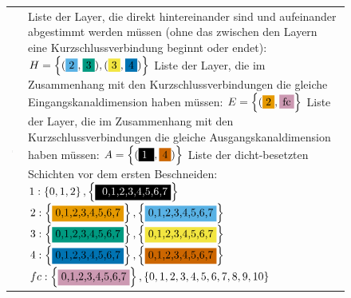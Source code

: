\begin{figure}
\begin{minipage}[c]{1\linewidth}
\begin{tabularx}{1\textwidth}{m{}m{}} \includegraphics[width=0.21\textwidth]{KapitelPartA/images/net.png} &Liste der Layer, die direkt hintereinander sind und aufeinander abgestimmt werden müssen (ohne das zwischen den Layern eine Kurzschlussverbindung beginnt oder endet): $H=\left\{(\colorbox{sky}{2},\colorbox{bluegreen}{3}),(\colorbox{yellow}{3},\colorbox{blue2}{4}) \right\}$\newline
Liste der Layer, die im Zusammenhang mit den Kurzschlussverbindungen die gleiche Eingangskanaldimension haben müssen: \newline$E=\left\{(\colorbox{orange}{2},\colorbox{purple}{fc} \right\}$ \newline
Liste der Layer, die im Zusammenhang mit den Kurzschlussverbindungen die gleiche Ausgangskanaldimension haben müssen: $A=\left\{ ( \colorbox{black}{\textcolor{white}{1} },\colorbox{vermi}{4} ) \right\} $ \newline
Liste der dicht-besetzten Schichten vor dem ersten Beschneiden:\newline
$1:\left\{0,1,2\right\},\left\{\colorbox{black}{ \textcolor{white}{0,1,2,3,4,5,6,7}} \right\}$ \newline
$2:\left\{\colorbox{orange}{0,1,2,3,4,5,6,7}\right\},\left\{\colorbox{sky}{0,1,2,3,4,5,6,7}\right\}$\newline
$3:\left\{\colorbox{bluegreen}{0,1,2,3,4,5,6,7}\right\},\left\{\colorbox{yellow}{0,1,2,3,4,5,6,7}\right\}$\newline
$4:\left\{\colorbox{blue2}{0,1,2,3,4,5,6,7}\right\},\left\{\colorbox{vermi}{0,1,2,3,4,5,6,7}\right\}$\newline
$fc:\left\{\colorbox{purple}{0,1,2,3,4,5,6,7}\right\},\left\{0,1,2,3,4,5,6,7,8,9,10\right\}$ \newline


\end{tabularx}
\end{minipage}
\end{figure}
